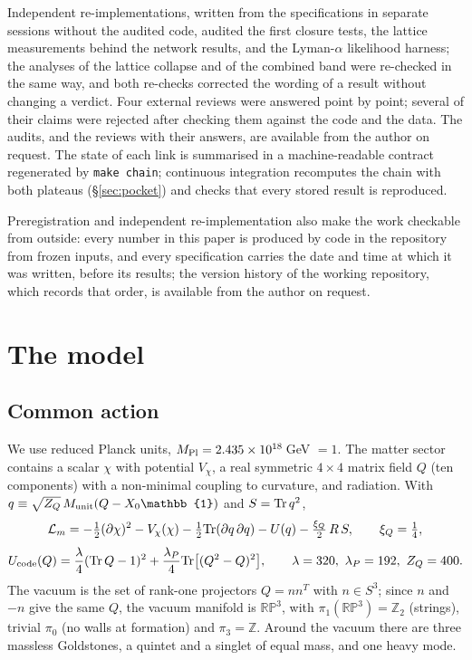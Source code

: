 \documentclass[11pt,a4paper]{article}
\newcommand{\RP}{\mathbb{RP}^3}
\newcommand{\Ztwo}{\mathbb{Z}_2}
\newcommand{\Mpl}{M_{\rm Pl}}
\begin{document}
Independent re-implementations, written from the specifications in separate sessions without the audited code, audited the first closure tests, the lattice measurements behind the network results, and the Lyman-$\alpha$ likelihood harness; the analyses of the lattice collapse and of the combined band were re-checked in the same way, and both re-checks corrected the wording of a result without changing a verdict.
Four external reviews were answered point by point; several of their claims were rejected after checking them against the code and the data. The audits, and the reviews with their answers, are available from the author on request.
The state of each link is summarised in a machine-readable contract regenerated by \texttt{make chain}; continuous integration recomputes the chain with both plateaus (\S\ref{sec:pocket}) and checks that every stored result is reproduced.

Preregistration and independent re-implementation also make the work checkable from outside: every number in this paper is produced by code in the repository from frozen inputs, and every specification carries the date and time at which it was written, before its results; the version history of the working repository, which records that order, is available from the author on request.

\section{The model}
\label{sec:model}

\subsection{Common action}

We use reduced Planck units, $\Mpl = 2.435\times10^{18}$\,GeV $=1$.
The matter sector contains a scalar $\chi$ with potential $V_\chi$, a real symmetric $4\times4$ matrix field $Q$ (ten components) with a non-minimal coupling to curvature, and radiation.
With $q \equiv \sqrt{Z_Q}\,M_{\rm unit}(Q - X_0\mathbb{1})$ and $S = {\rm Tr}\,q^2$,
\begin{equation}
\mathcal{L}_m = -\tfrac12(\partial\chi)^2 - V_\chi(\chi) - \tfrac12{\rm Tr}(\partial q\,\partial q) - U(q) - \tfrac{\xi_Q}{2}\,R\,S,\qquad \xi_Q = \tfrac14,
\end{equation}
\begin{equation}
U_{\rm code}(Q) = \frac{\lambda}{4}({\rm Tr}\,Q - 1)^2 + \frac{\lambda_P}{4}{\rm Tr}\big[(Q^2-Q)^2\big],\qquad \lambda=320,\ \lambda_P=192,\ Z_Q = 400 .
\end{equation}
The vacuum is the set of rank-one projectors $Q = nn^{T}$ with $n\in S^3$; since $n$ and $-n$ give the same $Q$, the vacuum manifold is $\RP$, with $\pi_1(\RP)=\Ztwo$ (strings), trivial $\pi_0$ (no walls at formation) and $\pi_3=\mathbb{Z}$.
Around the vacuum there are three massless Goldstones, a quintet and a singlet of equal mass, and one heavy mode.
\end{document}
